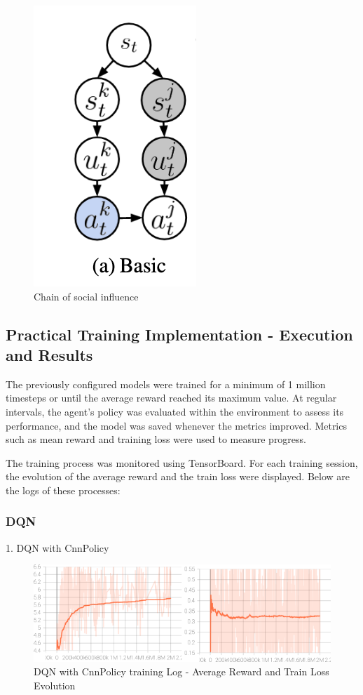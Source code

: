 \begin{figure}[h]
    \centering
    \includegraphics[scale=0.5]{images/social_influence.png}
    \caption{Chain of social influence}
    \label{fig:social influence}
\end{figure}



\subsection{Practical Training Implementation - Execution and Results}

The previously configured models were trained for a minimum of 1 million timesteps or until the average reward reached its maximum value. 
At regular intervals, the agent's policy was evaluated within the environment to assess its performance,
and the model was saved whenever the metrics improved. 
Metrics such as mean reward and training loss were used to measure progress.

The training process was monitored using TensorBoard. 
For each training session, the evolution of the average reward and the train loss were displayed. 
Below are the logs of these processes:


\subsubsection{DQN}

1. DQN with CnnPolicy

\begin{figure}[H]
    \centering
    \includegraphics[height=0.20\textheight]{images/dqn_cnn.png} 
    \caption{DQN with CnnPolicy training Log - Average Reward and Train Loss Evolution}
\end{figure}


